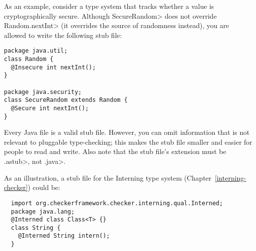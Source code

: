 
As an example, consider a type system that tracks whether a value is
cryptographically secure.  Although \<SecureRandom> does not override
\<Random.nextInt> (it overrides the source of randomness instead), you are
allowed to write the following stub file:

\begin{Verbatim}
package java.util;
class Random {
  @Insecure int nextInt();
}

package java.security;
class SecureRandom extends Random {
  @Secure int nextInt();
}
\end{Verbatim}



Every Java file is a valid stub file.  However, you can omit information
that is not relevant to pluggable type-checking; this makes the stub file
smaller and easier for people to read and write.
Also note that the stub file's extension must be \<.astub>, not \<.java>.

As an illustration, a stub file for the Interning type system
(Chapter~\ref{interning-checker}) could be:

\begin{Verbatim}
  import org.checkerframework.checker.interning.qual.Interned;
  package java.lang;
  @Interned class Class<T> {}
  class String {
    @Interned String intern();
  }
\end{Verbatim}

